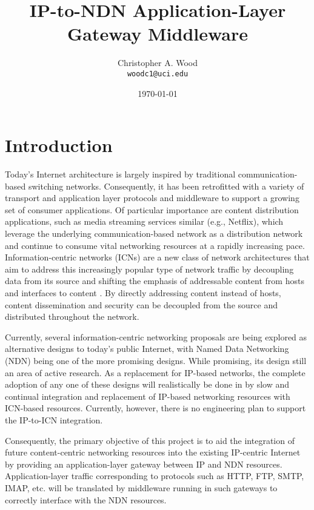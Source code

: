 \documentclass[10pt]{article}
\begin{document}
\title{IP-to-NDN Application-Layer Gateway Middleware}
\author{Christopher A. Wood \\ {\tt woodc1@uci.edu}}
\date{\today}
\maketitle


\section{Introduction}
Today's Internet architecture is largely inspired by traditional communication-based switching networks. Consequently, it has been retrofitted with a variety of transport and application layer protocols and middleware to support a growing set of consumer applications. Of particular importance are content distribution applications, such as media streaming services similar (e.g., Netflix), which leverage the underlying communication-based network as a distribution network and continue to consume vital networking resources at a rapidly increasing pace. Information-centric networks (ICNs) are a new class of network architectures that aim to address this increasingly popular type of network traffic by decoupling data from its source and shifting the emphasis of addressable content from hosts and interfaces to content \cite{}. By directly addressing content instead of hosts, content dissemination and security can be decoupled from the source and distributed throughout the network. 

Currently, several information-centric networking proposals are being explored as alternative designs to today's public Internet, with Named Data Networking (NDN) \cite{NDNtech} being one of the more promising designs. While promising, its design still an area of active research. As a replacement for IP-based networks, the complete adoption of any one of these designs will realistically be done in by slow and continual integration and replacement of IP-based networking resources with ICN-based resources. Currently, however, there is no engineering plan to support the IP-to-ICN integration. 

Consequently, the primary objective of this project is to aid the integration of future content-centric networking resources into the existing IP-centric Internet by providing an application-layer gateway between IP and NDN resources. Application-layer traffic corresponding to protocols such as HTTP, FTP, SMTP, IMAP, etc. will be translated by middleware running in such gateways to correctly interface with the NDN resources. 
\end{document}
